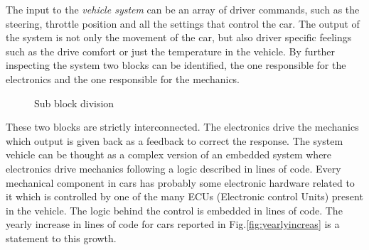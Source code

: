 \documentclass[../main.tex]{subfiles}
\begin{document}
The input to the \textit{vehicle system} can be an array of driver commands, such as the steering, throttle position and all the settings that control the car. The output of the system is not only the movement of the car, but also driver specific feelings such as the drive comfort or just the temperature in the vehicle. By further inspecting the system two blocks can be identified, the one responsible for the electronics and the one responsible for the mechanics. 
     \begin{figure}[ht]
        \begin{center}
        \end{center}
        \caption{Sub block division}
    \end{figure}       
These two blocks are strictly interconnected. The electronics drive the mechanics which output is given back as a feedback to correct the response. The system vehicle can be thought as a complex version of an embedded system where electronics drive mechanics following a logic described in lines of code.
Every mechanical component in cars has probably some electronic hardware related to it which is controlled by one of the many ECUs (Electronic control Units) present in the vehicle. The logic behind the control is embedded in lines of code. The yearly increase in lines of code for cars reported in Fig.\ref{fig:yearlyincreas} is a statement to this growth. 
\end{document}
